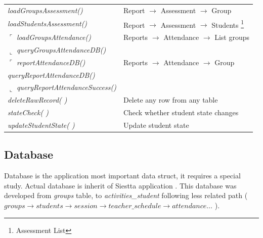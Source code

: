 \begin{bclogo}[couleur=orange!30,logo=\bcbook, arrondi=0.1,ombre=true ]
\begin{tabular}{ll}
\emph{ loadGroupsAssessment() }            & Report $\rightarrow$ Assessment $\rightarrow$  Group\\
\emph{ loadStudentsAssessment() }      & Report $\rightarrow$ Assessment $\rightarrow$   Students \footnote{Assessment List}\\

$\ulcorner$ \emph { loadGroupsAttendance()}         &{ Reports  $\rightarrow$ Attendance  $\rightarrow$ List  groups  } \\
$\llcorner$ \emph { queryGroupsAttendanceDB() }     &  \\

$\ulcorner$ \emph{ reportAttendanceDB()  }              & {  Reports $\rightarrow$  Attendance $\rightarrow$  Group }\\
\emph{ queryReportAttendanceDB() }          &  \\
$\llcorner$\emph{ queryReportAttendanceSuccess()}     &  \\

\emph { deleteRawRecord( ) }            & { Delete any row from any table } \\
\emph { stateCheck( )}                  &{ Check whether student state changes  }\\
\emph { updateStudentState( )}          &{ Update student state } \\

\end{tabular}
\end{bclogo}  
        
\subsection{Database}
Database is the application most important data struct, it requires a special study. Actual database
is inherit of Siestta application \cite{Siestta}. 
 This database was developed from \emph{groups} table,  to \emph{activities\_student} following less related 
 path ( $ groups \rightarrow students \rightarrow session \rightarrow teacher\_schedule \rightarrow attendance \dots $ ).

